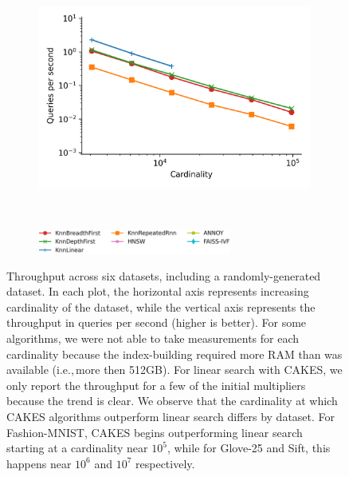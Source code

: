 \begin{figure}
\begin{subfigure}[b]{0.5\textwidth}
        \label{fig:results:silva-scaling}
    \end{subfigure}%
    \begin{subfigure}[b]{0.5\textwidth}
        \includegraphics[width=0.99\textwidth]{plots/radio-ml_Ball_10_throughput.png}
        \label{fig:results:radioml-scaling}
    \end{subfigure}%
    \\
    \begin{subfigure}[b]{0.94\textwidth}
        \centering
        \includegraphics[width=0.7\textwidth]{plots/legend.png}
        \label{fig:results:scaling-legend}
    \end{subfigure}%
    \caption{Throughput across six datasets, including a randomly-generated dataset.
    In each plot, the horizontal axis represents increasing cardinality of the dataset, while the vertical axis represents the throughput in queries per second (higher is better).
    For some algorithms, we were not able to take measurements for each cardinality because the index-building required more RAM than was available (i.e.,\,more then 512GB).
    For linear search with CAKES, we only report the throughput for a few of the initial multipliers because the trend is clear.
    We observe that the cardinality at which CAKES algorithms outperform linear search differs by dataset. For Fashion-MNIST, CAKES begins outperforming linear search starting at a cardinality near $10^5$, while for Glove-25 and Sift, this happens near $10^6$ and $10^7$ respectively.}
    \label{fig:results:scaling-plots}
\end{figure}


